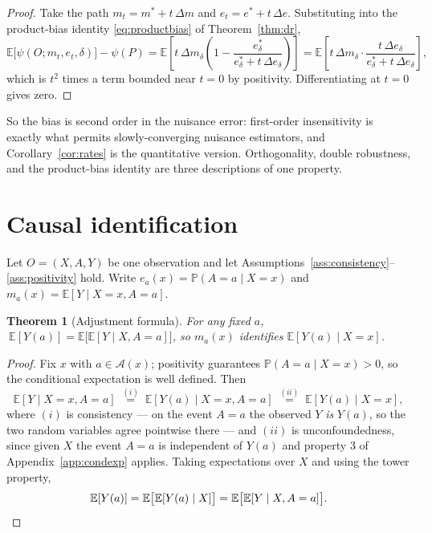 \documentclass[11pt,a4paper]{article}
\theoremstyle{plain}
\newtheorem{theorem}{Theorem}[section]
\theoremstyle{definition}
\theoremstyle{remark}
\newcommand{\E}{\mathbb E}
\newcommand{\Prob}{\mathbb P}
\begin{document}
\begin{proof}
Take the path $m_t=m^\ast+t\,\Delta m$ and $e_t=e^\ast+t\,\Delta e$. Substituting into the
product-bias identity \eqref{eq:productbias} of Theorem~\ref{thm:dr},
\[
\E\bigl[\psi(O;m_t,e_t,\delta)\bigr]-\psi(P)
=\E\left[t\,\Delta m_{\delta}\left(1-\frac{e^\ast_\delta}{e^\ast_\delta+t\,\Delta e_\delta}\right)\right]
=\E\left[t\,\Delta m_{\delta}\cdot\frac{t\,\Delta e_\delta}{e^\ast_\delta+t\,\Delta e_\delta}\right],
\]
which is $t^2$ times a term bounded near $t=0$ by positivity. Differentiating at $t=0$ gives
zero.
\end{proof}

So the bias is second order in the nuisance error: first-order insensitivity is exactly what
permits slowly-converging nuisance estimators, and Corollary~\ref{cor:rates} is the quantitative
version. Orthogonality, double robustness, and the product-bias identity are three descriptions
of one property.

\section{Causal identification}\label{app:causal}

Let $O=(X,A,Y)$ be one observation and let Assumptions~\ref{ass:consistency}--\ref{ass:positivity}
hold. Write $e_a(x)=\Prob(A=a\mid X=x)$ and $m_a(x)=\E[Y\mid X=x,A=a]$.

\begin{theorem}[Adjustment formula]\label{thm:adjust}
For any fixed $a$, $\ \E[Y(a)]=\E\bigl[\E[Y\mid X,A=a]\bigr]$, so $m_a(x)$ identifies
$\E[Y(a)\mid X=x]$.
\end{theorem}

\begin{proof}
Fix $x$ with $a\in\mathcal A(x)$; positivity guarantees $\Prob(A=a\mid X=x)>0$, so the
conditional expectation is well defined. Then
\[
\E[Y\mid X=x,A=a]
\;\overset{(i)}{=}\;\E[Y(a)\mid X=x,A=a]
\;\overset{(ii)}{=}\;\E[Y(a)\mid X=x],
\]
where $(i)$ is consistency --- on the event $A=a$ the observed $Y$ \emph{is} $Y(a)$, so the two
random variables agree pointwise there --- and $(ii)$ is unconfoundedness, since given $X$ the
event $A=a$ is independent of $Y(a)$ and property 3 of Appendix~\ref{app:condexp} applies.
Taking expectations over $X$ and using the tower property,
\[
\E[Y(a)]=\E\bigl[\E[Y(a)\mid X]\bigr]=\E\bigl[\E[Y\mid X,A=a]\bigr].\qedhere
\]
\end{proof}
\end{document}

